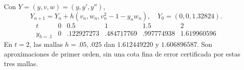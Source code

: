 Con \(Y=(y,v,w)=(y,y',y'')\),
\[Y_{n+1}=Y_n+h(v_n,w_n,v_n^2-1-y_nw_n),\quad Y_0=(0,0,1.32824).\]
\[\begin{array}{c|rrrrr}t&0&0.5&1&1.5&2\\\hline
y_{h=.1}&0&.122927273&.484717769&.997774938&1.619960596\end{array}\]
En \(t=2\), las mallas \(h=.05,.025\) dan \(1.612449220\) y \(1.606896587\).
Son aproximaciones de primer orden, sin una cota fina de error certificada por estas tres mallas.

